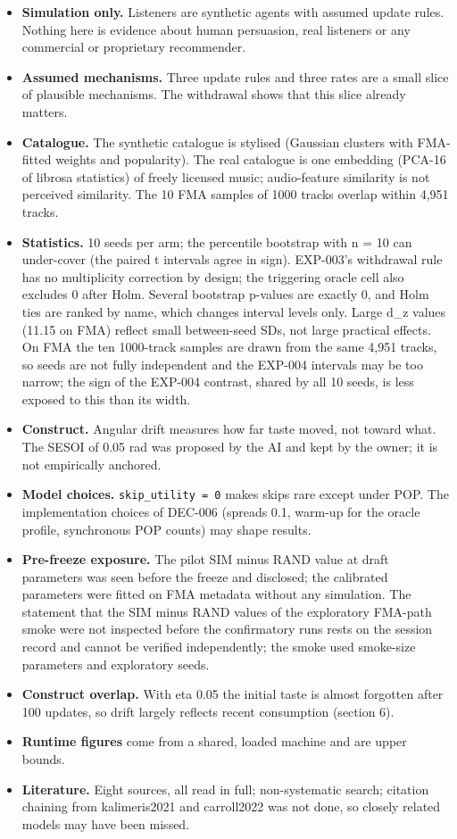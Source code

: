 \documentclass[
]{article}
\providecommand{\tightlist}{%
  \setlength{\itemsep}{0pt}\setlength{\parskip}{0pt}}
\begin{document}
\begin{itemize}
\tightlist
\item
  \textbf{Simulation only.} Listeners are synthetic agents with assumed
  update rules. Nothing here is evidence about human persuasion, real
  listeners or any commercial or proprietary recommender.
\item
  \textbf{Assumed mechanisms.} Three update rules and three rates are a
  small slice of plausible mechanisms. The withdrawal shows that this
  slice already matters.
\item
  \textbf{Catalogue.} The synthetic catalogue is stylised (Gaussian
  clusters with FMA-fitted weights and popularity). The real catalogue
  is one embedding (PCA-16 of librosa statistics) of freely licensed
  music; audio-feature similarity is not perceived similarity. The 10
  FMA samples of 1000 tracks overlap within 4,951 tracks.
\item
  \textbf{Statistics.} 10 seeds per arm; the percentile bootstrap with n
  = 10 can under-cover (the paired t intervals agree in sign). EXP-003's
  withdrawal rule has no multiplicity correction by design; the
  triggering oracle cell also excludes 0 after Holm. Several bootstrap
  p-values are exactly 0, and Holm ties are ranked by name, which
  changes interval levels only. Large d\_z values (11.15 on FMA) reflect
  small between-seed SDs, not large practical effects. On FMA the ten
  1000-track samples are drawn from the same 4,951 tracks, so seeds are
  not fully independent and the EXP-004 intervals may be too narrow; the
  sign of the EXP-004 contrast, shared by all 10 seeds, is less exposed
  to this than its width.
\item
  \textbf{Construct.} Angular drift measures how far taste moved, not
  toward what. The SESOI of 0.05 rad was proposed by the AI and kept by
  the owner; it is not empirically anchored.
\item
  \textbf{Model choices.} \texttt{skip\_utility\ =\ 0} makes skips rare
  except under POP. The implementation choices of DEC-006 (spreads 0.1,
  warm-up for the oracle profile, synchronous POP counts) may shape
  results.
\item
  \textbf{Pre-freeze exposure.} The pilot SIM minus RAND value at draft
  parameters was seen before the freeze and disclosed; the calibrated
  parameters were fitted on FMA metadata without any simulation. The
  statement that the SIM minus RAND values of the exploratory FMA-path
  smoke were not inspected before the confirmatory runs rests on the
  session record and cannot be verified independently; the smoke used
  smoke-size parameters and exploratory seeds.
\item
  \textbf{Construct overlap.} With eta 0.05 the initial taste is almost
  forgotten after 100 updates, so drift largely reflects recent
  consumption (section 6).
\item
  \textbf{Runtime figures} come from a shared, loaded machine and are
  upper bounds.
\item
  \textbf{Literature.} Eight sources, all read in full; non-systematic
  search; citation chaining from kalimeris2021 and carroll2022 was not
  done, so closely related models may have been missed.
\end{itemize}
\end{document}
